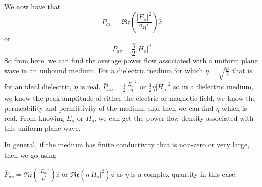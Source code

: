 We now have that 
\begin{dmath*}
\bar{P}_{av}=\mathfrak{Re}(\frac{|E_{o}|^{2}}{2\eta^{*}})\hat{z}
\end{dmath*}
or 
\begin{dmath}
\bar{P}_{av}=\frac{\eta}{2}|H_{o}|^{2}
\end{dmath}
So from here, we can find the average power flow associated with a uniform plane wave in an unbound medium. For a dielectric medium,for which $ \eta=\sqrt{\frac{\mu}{2}} $ that is for an ideal dielectric, $ \eta $ is real.
$ \bar{P}_{av}=\frac{1}{2}\frac{|E_{o}|^{2}}{\eta} $ or $ \frac{1}{2}\eta|H_{o}|^{2} $ so in a dielectric medium, we know the peak amplitude of either the electric or magnetic field, we know the permeability and permittivity of the medium, and then we can find $ \eta $ which is real. From knowing $ E_{o} $ or $ H_{o} $, we can get the power flow density associated with this uniform plane wave.

In general, if the medium has finite conductivity that is non-zero or very large, then we go using

$ \bar{P}_{av}=\mathfrak{Re}(\frac{|E_{o}|^{2}}{\mu^{*}})\hat{z} $ or $ \mathfrak{Re}(\eta|H_{o}|^{2})\hat{z} $ 
as $ \eta $ is a complex quantity in this case.

